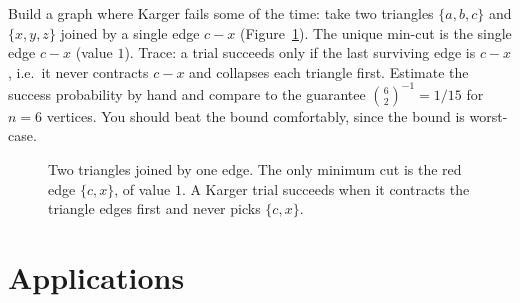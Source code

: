 \begin{labbox}
Build a graph where Karger fails some of the time: take two triangles $\{a,b,c\}$ and $\{x,y,z\}$ joined by a single edge $c{-}x$ (Figure~\ref{ch11:fig-two-triangles}). The unique min-cut is the single edge $c{-}x$ (value $1$). Trace: a trial succeeds only if the last surviving edge is $c{-}x$, i.e.\ it never contracts $c{-}x$ and collapses each triangle first. Estimate the success probability by hand and compare to the guarantee $\binom62^{-1}=1/15$ for $n=6$ vertices. You should beat the bound comfortably, since the bound is worst-case.
\end{labbox}

\begin{figure}[htbp]
\centering
{}
\caption{Two triangles joined by one edge. The only minimum cut is the red edge $\{c,x\}$, of value $1$. A Karger trial succeeds when it contracts the triangle edges first and never picks $\{c,x\}$.}
\label{ch11:fig-two-triangles}
\end{figure}

\section{Applications}

